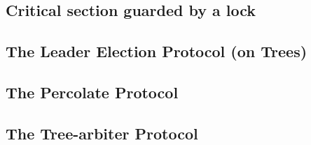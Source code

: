 %

\subsection{Critical section guarded by a lock}


%

%

% 
\newpage
\subsection{The Leader Election Protocol (on Trees)}

\subsection{The Percolate Protocol}

\newpage
\subsection{The Tree-arbiter Protocol}

%

%
